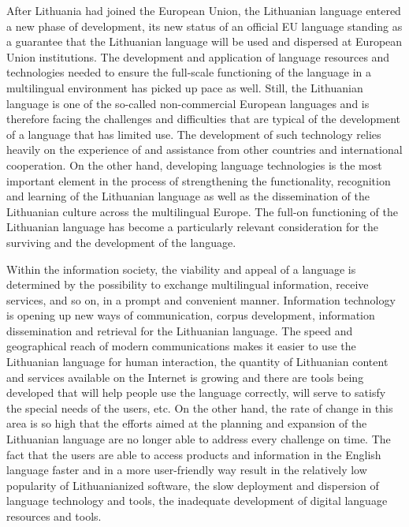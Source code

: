 \begin{multicols}{2}
After Lithuania had joined the European Union, the Lithuanian language entered a new phase of development, its new status of an official EU language standing as a guarantee that the Lithuanian language will be used and dispersed at European Union institutions. The development and application of language resources and technologies needed to ensure the full-scale functioning of the language in a multilingual environment has picked up pace as well. Still, the Lithuanian language is one of the so-called non-commercial European languages and is therefore facing the challenges and difficulties that are typical of the development of a language that has limited use. The development of such technology relies heavily on the experience of and assistance from other countries and international cooperation. On the other hand, developing language technologies is the most important element in the process of strengthening the functionality, recognition and learning of the Lithuanian language as well as the dissemination of the Lithuanian culture across the multilingual Europe. The full-on functioning of the Lithuanian language has become a particularly relevant consideration for the surviving and the development of the language.

Within the information society, the viability and appeal of a language is determined by the possibility to exchange multilingual information, receive services, and so on, in a prompt and convenient manner. Information technology is opening up new ways of communication, corpus development, information dissemination and retrieval for the Lithuanian language. The speed and geographical reach of modern communications makes it easier to use the Lithuanian language for human interaction, the quantity of Lithuanian content and services available on the Internet is growing and there are tools being developed that will help people use the language correctly, will serve to satisfy the special needs of the users, etc. On the other hand, the rate of change in this area is so high that the efforts aimed at the planning and expansion of the Lithuanian language are no longer able to address every challenge on time. The fact that the users are able to access products and information in the English language faster and in a more user-friendly way result in the relatively low popularity of Lithuanianized software, the slow deployment and dispersion of language technology and tools, the inadequate development of digital language resources and tools.


\end{multicols}
